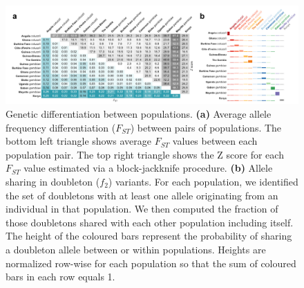 \documentclass[a4paper,11pt,abstracton,hidelinks]{scrartcl}
\begin{document}
\begin{figure}[H]
	\begin{center}
		\includegraphics*[width=6.3in]{artwork/structure_composite.pdf}
	\end{center}
	\caption{Genetic differentiation between populations. \textbf{(a)} Average allele frequency differentiation ($F_{ST}$) between pairs of populations. The bottom left triangle shows average $F_{ST}$ values between each population pair. The top right triangle shows the Z score for each $F_{ST}$ value estimated via a block-jackknife procedure. \textbf{(b)} Allele sharing in doubleton ($f_{2}$) variants. For each population, we identified the set of doubletons with at least one allele originating from an individual in that population. We then computed the fraction of those doubletons shared with each other population including itself. The height of the coloured bars represent the probability of sharing a doubleton allele between or within populations. Heights are normalized row-wise for each population so that the sum of coloured bars in each row equals 1.
}
	\label{fig:fstdbl}
\end{figure}
\end{document}
